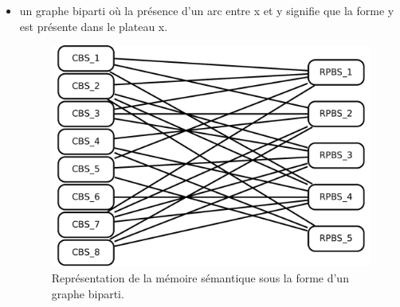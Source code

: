 \begin{itemize}
\item un graphe biparti où la présence d'un arc entre x et y signifie que la forme y est présente dans le plateau x.
\begin{figure}[H]
\includegraphics[width=\textwidth]{files/memoire/context_graph}
\caption{Représentation de la mémoire sémantique sous la forme d'un graphe biparti.}
\end{figure}
\end{itemize}